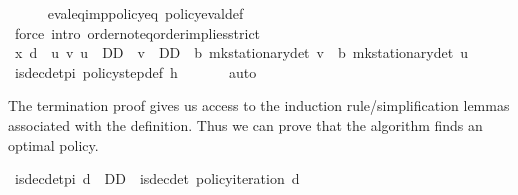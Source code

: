 \begin{isabellebody}
\ \ \ \ \isamarkupfalse%
\ eval{\isacharunderscore}{\kern0pt}eq{\isacharunderscore}{\kern0pt}imp{\isacharunderscore}{\kern0pt}policy{\isacharunderscore}{\kern0pt}eq\ policy{\isacharunderscore}{\kern0pt}eval{\isacharunderscore}{\kern0pt}def\isanewline
\ \ \ \ \isamarkupfalse%
\ {\isacharparenleft}{\kern0pt}force\ intro{\isacharbang}{\kern0pt}{\isacharcolon}{\kern0pt}\ order{\isachardot}{\kern0pt}not{\isacharunderscore}{\kern0pt}eq{\isacharunderscore}{\kern0pt}order{\isacharunderscore}{\kern0pt}implies{\isacharunderscore}{\kern0pt}strict{\isacharparenright}{\kern0pt}\isanewline
\ \ \isamarkupfalse%
\ {\isachardoublequoteopen}{\isacharparenleft}{\kern0pt}x{\isacharcomma}{\kern0pt}\ d{\isacharparenright}{\kern0pt}\ {\isasymin}\ {\isacharbraceleft}{\kern0pt}{\isacharparenleft}{\kern0pt}u{\isacharcomma}{\kern0pt}\ v{\isacharparenright}{\kern0pt}{\isachardot}{\kern0pt}\ u\ {\isasymin}\ D\isactrlsub D\ {\isasymand}\ v\ {\isasymin}\ D\isactrlsub D\ {\isasymand}\ {\isasymnu}\isactrlsub b\ {\isacharparenleft}{\kern0pt}mk{\isacharunderscore}{\kern0pt}stationary{\isacharunderscore}{\kern0pt}det\ v{\isacharparenright}{\kern0pt}\ {\isacharless}{\kern0pt}\ {\isasymnu}\isactrlsub b\ {\isacharparenleft}{\kern0pt}mk{\isacharunderscore}{\kern0pt}stationary{\isacharunderscore}{\kern0pt}det\ u{\isacharparenright}{\kern0pt}{\isacharbraceright}{\kern0pt}{\isachardoublequoteclose}\isanewline
\ \ \ \ \isamarkupfalse%
\ is{\isacharunderscore}{\kern0pt}dec{\isacharunderscore}{\kern0pt}det{\isacharunderscore}{\kern0pt}pi\ policy{\isacharunderscore}{\kern0pt}step{\isacharunderscore}{\kern0pt}def\ h\ \isanewline
\ \ \ \ \isamarkupfalse%
\ auto\isanewline
{}\isamarkupfalse%
%
\endisatagproof
{\isafoldproof}%
%
\isadelimproof
%
\endisadelimproof
%
\begin{isamarkuptext}%
The termination proof gives us access to the induction rule/simplification lemmas associated 
with the  definition.
Thus we can prove that the algorithm finds an optimal policy.%
\end{isamarkuptext}\isamarkuptrue%
\isamarkupfalse%
\ is{\isacharunderscore}{\kern0pt}dec{\isacharunderscore}{\kern0pt}det{\isacharunderscore}{\kern0pt}pi{\isacharprime}{\kern0pt}{\isacharcolon}{\kern0pt}\ {\isachardoublequoteopen}d\ {\isasymin}\ D\isactrlsub D\ {\isasymLongrightarrow}\ is{\isacharunderscore}{\kern0pt}dec{\isacharunderscore}{\kern0pt}det\ {\isacharparenleft}{\kern0pt}policy{\isacharunderscore}{\kern0pt}iteration\ d{\isacharparenright}{\kern0pt}{\isachardoublequoteclose}\isanewline

\end{isabellebody}
